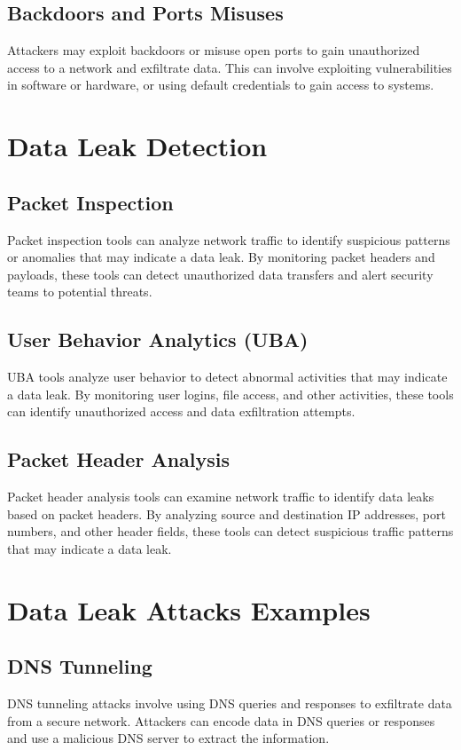 \documentclass{article}
\begin{document}
\subsection{Backdoors and Ports Misuses}
Attackers may exploit backdoors or misuse open ports to gain unauthorized access to a network and exfiltrate data. This can involve exploiting vulnerabilities in software or hardware, or using default credentials to gain access to systems.

\section{Data Leak Detection}

\subsection{Packet Inspection}
Packet inspection tools can analyze network traffic to identify suspicious patterns or anomalies that may indicate a data leak. By monitoring packet headers and payloads, these tools can detect unauthorized data transfers and alert security teams to potential threats.

\subsection{User Behavior Analytics (UBA)}
UBA tools analyze user behavior to detect abnormal activities that may indicate a data leak. By monitoring user logins, file access, and other activities, these tools can identify unauthorized access and data exfiltration attempts.

\subsection{Packet Header Analysis}
Packet header analysis tools can examine network traffic to identify data leaks based on packet headers. By analyzing source and destination IP addresses, port numbers, and other header fields, these tools can detect suspicious traffic patterns that may indicate a data leak.

\section{Data Leak Attacks Examples}

\subsection{DNS Tunneling}
DNS tunneling attacks involve using DNS queries and responses to exfiltrate data from a secure network. Attackers can encode data in DNS queries or responses and use a malicious DNS server to extract the information.
\end{document}
